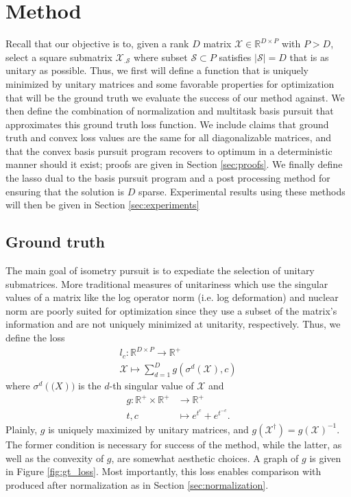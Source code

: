 \section{Method}

Recall that our objective is to, given a rank $D$ matrix $\mathcal X \in \mathbb R^{D \times P}$ with $P > D$, select a square submatrix $\mathcal X_{.\mathcal S}$ where subset $\mathcal S \subset P$ satisfies $|\mathcal S| = D$ that is as unitary as possible.
Thus, we first will define a function that is uniquely minimized by unitary matrices and some favorable properties for optimization that will be the ground truth we evaluate the success of our method against.
We then define the combination of normalization and multitask basis pursuit that approximates this ground truth loss function.
We include claims that ground truth and convex loss values are the same for all diagonalizable matrices, and that the convex basis pursuit program recovers to optimum in a deterministic manner should it exist; proofs are given in Section \ref{sec:proofs}.
We finally define the lasso dual to the basis pursuit program and a post processing method for ensuring that the solution is $D$ sparse.
Experimental results using these methods will then be given in Section \ref{sec:experiments}

\subsection{Ground truth}
\label{sec:ground_truth}

The main goal of isometry pursuit is to expediate the selection of unitary submatrices.
More traditional measures of unitariness which use the singular values of a matrix like the log operator norm (i.e. log deformation) and nuclear norm are poorly suited for  optimization since they use a subset of the matrix's information and are not uniquely minimized at unitarity, respectively.
Thus, we define the loss
\begin{align}
l_{c}: \mathbb R^{D \times P} \to \mathbb R^{+} \\
\mathcal X \mapsto \sum_{d = 1}^D g(\sigma^d(\mathcal X), c)
\end{align}
where $\sigma^d (\mathcal (X))$ is the $d$-th singular value of $\mathcal X$ and
\begin{align}
g: \mathbb R^+ \times \mathbb R^+ &\to \mathbb R^+ \\
t,c &\mapsto e^{t^c} + e^{t^{-c}}.
\end{align}
Plainly, $g$ is uniquely maximized by unitary matrices, and $g(\mathcal X^{\dagger}) = g(\mathcal X)^{-1}$.
The former condition is necessary for success of the method, while the latter, as well as the convexity of $g$, are somewhat aesthetic choices.
A graph of $g$ is given in Figure \ref{fig:gt_loss}.
Most importantly, this loss enables comparison with produced after normalization as in Section \ref{sec:normalization}.

